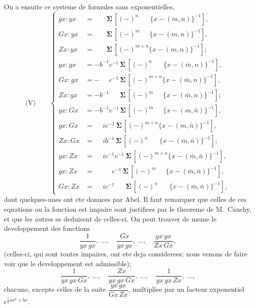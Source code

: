 \documentclass[11pt,a4paper]{article}
\begin{document}
On a ensuite ce systeme de formules sans exponentielles,
\begin{equation*}
\text{(V)}\qquad
\left\{
\begin{aligned}
gx : yx &= \phantom{ie^{-1}}\boldsymbol{\Sigma}\, [(-)^n \phantom{+m}\{x - (m, n)\}^{-1}],\\
Gx : yx &= \phantom{ie^{-1}}\boldsymbol{\Sigma}\, [(-)^m \phantom{+n}\{x - (m, n)\}^{-1}],\\
Zx : yx &= \phantom{ie^{-1}}\boldsymbol{\Sigma}\, [(-)^{m+n} \{x - (m, n)\}^{-1}];\\
yx : gx &= -b^{-1} c^{-1}\, \boldsymbol{\Sigma}\, [(-)^n \phantom{+m}\{x - (\bar{m}, n)\}^{-1}],\\
Gx : gx &= -\phantom{b^{-1}} c^{-1}\, \boldsymbol{\Sigma}\, [(-)^{m+n} \{x - (\bar{m}, n)\}^{-1}],\\
Zx : gx &= -b^{-1} \phantom{c^{-1}}\, \boldsymbol{\Sigma}\, [(-)^m \phantom{+n}\{x - (\bar{m}, n)\}^{-1}];\\
yx : Gx &= -b^{-1} e^{-1}\, \boldsymbol{\Sigma}\, [(-)^m \phantom{+n}\{x - (m, \bar{n})\}^{-1}],\\
gx : Gx &= \phantom{-}ie^{-1}\, \boldsymbol{\Sigma}\, [(-)^{m+n} \{x - (m, \bar{n})\}^{-1}],\\
Zx : Gx &= \phantom{-}ib^{-1}\, \boldsymbol{\Sigma}\, [(-)^n \phantom{+m}\{x - (m, \bar{n})\}^{-1}];\\
yx : Zx &= \phantom{-}ic^{-1} e^{-1}\, \boldsymbol{\Sigma}\, [(-)^{m+n} \{x - (\bar{m}, \bar{n})\}^{-1}],\\
gx : Zx &= \phantom{-ie^{-1}} e^{-1}\, \boldsymbol{\Sigma}\, [(-)^m \phantom{+n}\{x - (\bar{m}, \bar{n})\}^{-1}],\\
Gx : Zx &= \phantom{-}ic^{-1} \phantom{e^{-1}}\, \boldsymbol{\Sigma}\, [(-)^n \phantom{+m}\{x - (\bar{m}, \bar{n})\}^{-1}],
\end{aligned}
\right.
\end{equation*}
dont quelques-unes ont ete donnees par Abel. Il faut remarquer que celles de ces
equations ou la fonction est impaire sont justifiees par le theoreme de M.~Cauchy, et
que les autres se deduisent de celles-ci. On peut trouver de meme le developpement
des fonctions
\[\frac{1}{yx\, gx},\ \ldots,\quad \frac{Gx}{yx\, gx},\ \ldots,\quad \frac{yx\, gx}{Zx\, Gx},\]
(celles-ci, qui sont toutes impaires, ont ete deja considerees; nous venons de faire voir
que le developpement est admissible);
\[\frac{1}{yx\, gx\, Gx},\ \ldots,\quad \frac{Zx}{yx\, gx\, Gx},\ \ldots,\quad \frac{1}{yx\, gx\, Zx},\ \ldots,\]
chacune, excepte celles de la suite $\dfrac{yx\, gx}{Gx\, Zx}$, multipliee par un facteur exponentiel
$\epsilon^{\frac{1}{2}ax^2+bx}$.
\end{document}
